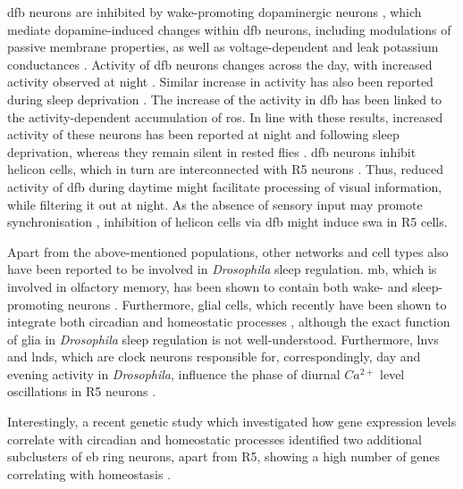 \documentclass[../main.tex]{subfiles}
\begin{document}
\gls{dfb} neurons are inhibited by wake-promoting dopaminergic neurons \cite{liuTwoDopaminergicNeurons2012}, which mediate dopamine-induced changes within \gls{dfb} neurons, including modulations of passive membrane properties, as well as voltage-dependent and leak potassium conductances \cite{pimentelOperationHomeostaticSleep2016}. Activity of \gls{dfb} neurons changes across the day, with increased activity observed at night \cite{raccugliaCoherentMultilevelNetwork2022}. Similar increase in activity has also been reported during sleep deprivation \cite{pimentelOperationHomeostaticSleep2016}. The increase of the activity in \gls{dfb} has been linked to the activity-dependent accumulation of \gls{ros}. In line with these results, increased activity of these neurons has been reported at night \cite{raccugliaCoherentMultilevelNetwork2022} and following sleep deprivation, whereas they remain silent in rested flies \cite{pimentelOperationHomeostaticSleep2016}. \gls{dfb} neurons inhibit helicon cells, which in turn are interconnected with R5 neurons \cite{suarez-grimaltNeuralArchitectureSleep2021,raccugliaCoherentMultilevelNetwork2022,shaferRegulationDrosophilaSleep2021}.
Thus, reduced activity of \gls{dfb} during daytime might facilitate processing of visual information, while filtering it out at night. As the absence of sensory input may promote synchronisation \cite{raccugliaCoherentMultilevelNetwork2022}, inhibition of helicon cells via \gls{dfb} might induce \gls{swa} in R5 cells.

Apart from the above-mentioned populations, other networks and cell types also have been reported to be involved in \textit{Drosophila} sleep regulation. \gls{mb}, which is involved in olfactory memory, has been shown to contain both wake- and sleep-promoting neurons
\cite{suarez-grimaltNeuralArchitectureSleep2021,dubowyCircadianRhythmsSleep2017}. Furthermore, glial cells, which recently have been shown to integrate both circadian and homeostatic processes \cite{doppSinglecellTranscriptomicsReveals2024}, although the exact function of glia in \textit{Drosophila} sleep regulation is not well-understood. Furthermore,  \glspl{lnv} and \glspl{lnd}, which are clock neurons responsible for, correspondingly, day and evening activity in \textit{Drosophila}, influence the phase of diurnal $Ca^{2+}$ level oscillations in R5 neurons \cite{andreaniCircadianProgrammingEllipsoid2022,liangMorningEveningCircadian2019}.

Interestingly, a recent genetic study which investigated how gene expression levels correlate with circadian and homeostatic processes identified two additional subclusters of \gls{eb} ring neurons, apart from R5, showing a high number of genes correlating with homeostasis \cite{doppSinglecellTranscriptomicsReveals2024}.
\end{document}
